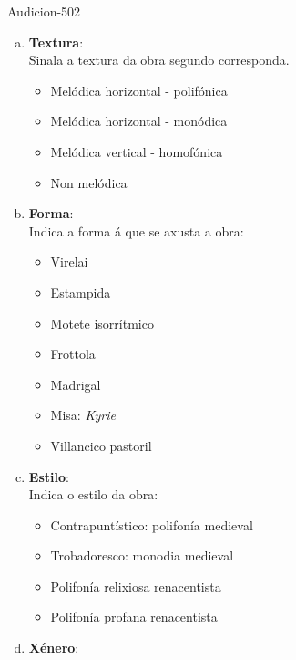 \begin{defproblem}{Audicion-502}
\begin{ejercicio}[]
\begin{enumerate}[1.-]
\begin{multicols}{2}
\begin{enumerate}[a)]
			\normalsize
		    \item
		    \textbf{Textura}: \\
		    \small{Sinala a textura da obra segundo corresponda.} \par
			\begin{itemize}
                \item
			     Melódica horizontal - polifónica
                 \item
			     Melódica horizontal - monódica
			     \item
			     Melódica vertical - homofónica
			     \item
				Non melódica
			\end{itemize}
            \normalsize
            \item
			\textbf{Forma}: \\
				\small{Indica a forma á que se axusta a obra:} \par
			\begin{itemize}
			     \item
			     Virelai
			    \item
			     Estampida
			     \item
			     Motete isorrítmico
			     \item
			     Frottola
			     \item
			     Madrigal
			     \item
			     Misa: \emph{Kyrie}
			     \item
			     Villancico pastoril
			\end{itemize}
            \normalsize
		    \item
			\textbf{Estilo}: \\
				\small{Indica o estilo da obra:} \par
			\begin{itemize}
                \item
			     Contrapuntístico: polifonía medieval
                 \item
			     Trobadoresco: monodia medieval
			     \item
			     Polifonía relixiosa renacentista
			     \item
			     Polifonía profana renacentista
			\end{itemize}
            \normalsize
		    \item
			\textbf{Xénero}: \\

\end{enumerate}
\end{multicols}
\end{enumerate}
\end{ejercicio}
\end{defproblem}
